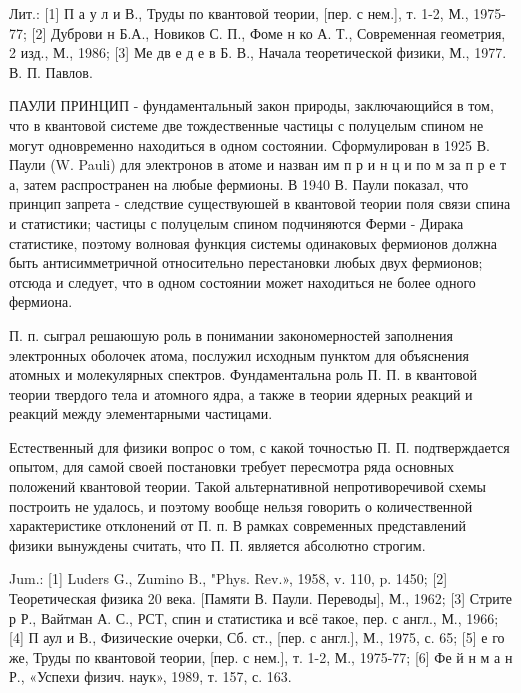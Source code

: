 \documentclass[10pt]{article}
\begin{document}
Лит.: [1] П а у л и В., Труды по квантовой теории, [пер. с нем.], т. 1-2, М., 1975-77; [2] Дуброви н Б.А., Новиков С. П., Фоме н ко А. Т., Современная геометрия, 2 изд., М., 1986; [3] Ме дв е д е в Б. В., Начала теоретической физики, М., 1977. В. П. Павлов.



ПАУЛИ ПРИНЦИП - фундаментальный закон природы, заключающийся в том, что в квантовой системе две тождественные частицы с полуцелым спином не могут одновременно находиться в одном состоянии. Сформулирован в 1925 В. Паули (W. Pauli) для электронов в атоме и назван им п р и н ц и по м за п р е т а, затем распространен на любые фермионы. В 1940 В. Паули показал, что принцип запрета - следствие существуюшей в квантовой теории поля связи спина и статистики; частицы с полуцелым спином подчиняются Ферми - Дирака статистике, поэтому волновая функция системы одинаковых фермионов должна быть антисимметричной относительно перестановки любых двух фермионов; отсюда и следует, что в одном состоянии может находиться не более одного фермиона.



П. п. сыграл решаюшую роль в понимании закономерностей заполнения электронных оболочек атома, послужил исходным пунктом для объяснения атомных и молекулярных спектров. Фундаментальна роль П. П. в квантовой теории твердого тела и атомного ядра, а также в теории ядерных реакций и реакций между элементарными частицами.



Естественный для физики вопрос о том, с какой точностью П. П. подтверждается опытом, для самой своей постановки требует пересмотра ряда основных положений квантовой теории. Такой альтернативной непротиворечивой схемы построить не удалось, и поэтому вообще нельзя говорить о количественной характеристике отклонений от П. п. В рамках современных представлений физики вынуждены считать, что П. П. является абсолютно строгим.



Jum.: [1] Luders G., Zumino B., "Phys. Rev.», 1958, v. 110, p. 1450; [2] Теоретическая физика 20 века. [Памяти В. Паули. Переводы], М., 1962; [3] Стрите р Р., Вайтман А. С., РСТ, спин и статистика и всё такое, пер. с англ., М., 1966; [4] П аул и В., Физические очерки, Сб. ст., [пер. с англ.], М., 1975, с. 65; [5] е го же, Труды по квантовой теории, [пер. с нем.], т. 1-2, М., 1975-77; [6] Фе й н м а н Р., «Успехи физич. наук», 1989, т. 157, с. 163.
\end{document}

